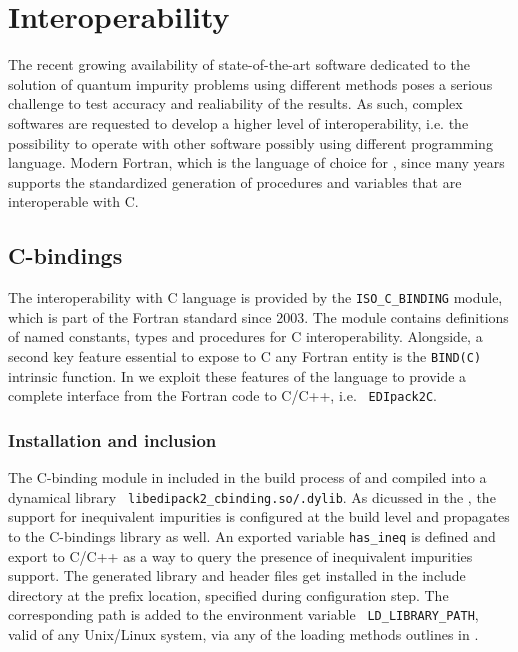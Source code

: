 \documentclass[edipack2.tex]{subfiles}
\begin{document}
\section{Interoperability}\label{SecInterop}
The recent growing availability of state-of-the-art software dedicated
to the solution of quantum impurity problems using different methods
poses a serious challenge to test accuracy and realiability of the
results.
As such, complex softwares are requested to develop a higher level of
interoperability, i.e. the possibility to operate with other software
possibly using different programming language.
Modern Fortran, which is the language of choice for \NAME, since many
years supports the standardized generation of procedures and
variables that are interoperable with C.


\subsection{C-bindings}\label{sSecInteropCbindings}
The interoperability with C language is provided by the
{\tt ISO\_C\_BINDING} module, which is part of the Fortran
standard since 2003. The module contains definitions of named
constants, types and procedures for C interoperability.
Alongside, a second key feature essential to expose to C any Fortran
entity is the {\tt BIND(C)} intrinsic function.
In \NAME we exploit these features of the language to provide a
complete interface from the Fortran code to C/C++, i.e. {\tt
  EDIpack2C}. 


\subsubsection{Installation and inclusion}\label{sSecInteropCbindingsInstallation}
The C-binding module in included in the build process of \NAME and
compiled into a dynamical library {\tt
  libedipack2\_cbinding.so/.dylib}. As dicussed in the
, the support for inequivalent
impurities is configured at the build level and propagates to the
C-bindings library as well. An exported variable {\tt has\_ineq} is
defined and export to C/C++ as a way to query the presence of
inequivalent impurities support. 
The generated library and header files get installed in the include
directory at the prefix location, specified during configuration
step. The corresponding path is added to the environment variable {\tt
  LD\_LIBRARY\_PATH}, valid of any Unix/Linux system, via any of the
loading methods outlines in . 
\end{document}
